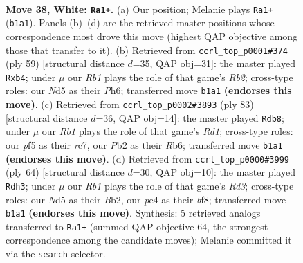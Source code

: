 \documentclass[11pt]{article}
\begin{document}
\clearpage

\begin{figure}[p]\centering
\begin{subfigure}{0.46\textwidth}\centering
\resizebox{\linewidth}{!}{%
\newchessgame
\chessboard[
  setfen={8/pp5R/8/2pN1p1P/k3p3/8/1P4rr/1R1K4 w - - 0 38},
  showmover=false,
  pgfstyle=straightmove, color=movearrow, markmove={b1-a1}
]}
\caption{}
\end{subfigure}\hfill
\begin{subfigure}{0.46\textwidth}\centering
\resizebox{\linewidth}{!}{%
\newchessgame
\chessboard[
  setfen={3r4/pr3k2/5P1p/4p3/1P5P/3p1P2/1P4P1/R2R2K1 b - - 0 30},
  showmover=false,
  pgfstyle=straightmove, color=movearrow, markmove={b7-b4}
]}
\caption{}
\end{subfigure}
\\[4pt]
\begin{subfigure}{0.46\textwidth}\centering
\resizebox{\linewidth}{!}{%
\newchessgame
\chessboard[
  setfen={3r3k/2R1R3/1r4p1/1p6/8/PP6/2P4P/2K2n2 b - - 5 42},
  showmover=false,
  pgfstyle=straightmove, color=movearrow, markmove={d8-b8}
]}
\caption{}
\end{subfigure}\hfill
\begin{subfigure}{0.46\textwidth}\centering
\resizebox{\linewidth}{!}{%
\newchessgame
\chessboard[
  setfen={5b2/3k1p2/1p6/3P4/2r3rP/1p1R4/1B6/1K5R w - - 0 33},
  showmover=false,
  pgfstyle=straightmove, color=movearrow, markmove={d3-h3}
]}
\caption{}
\end{subfigure}
\caption{\textbf{Move 38, White: \texttt{Ra1+}.} (a) Our position; Melanie plays \texttt{Ra1+} (\texttt{b1a1}). Panels (b)--(d) are the retrieved master positions whose correspondence most drove this move (highest QAP objective among those that transfer to it). (b) Retrieved from \texttt{ccrl\_top\_p0001\#374} (ply 59) [structural distance $d$=35, QAP obj=31]: the master played \texttt{Rxb4}; under $\mu$ our \emph{Rb1} plays the role of that game's \emph{Rb2}; cross-type roles: our \emph{N}d5 as their \emph{P}h6; transferred move \texttt{b1a1} \textbf{(endorses this move)}. (c) Retrieved from \texttt{ccrl\_top\_p0002\#3893} (ply 83) [structural distance $d$=36, QAP obj=14]: the master played \texttt{Rdb8}; under $\mu$ our \emph{Rb1} plays the role of that game's \emph{Rd1}; cross-type roles: our \emph{p}f5 as their \emph{r}c7, our \emph{P}b2 as their \emph{R}b6; transferred move \texttt{b1a1} \textbf{(endorses this move)}. (d) Retrieved from \texttt{ccrl\_top\_p0000\#3999} (ply 64) [structural distance $d$=30, QAP obj=10]: the master played \texttt{Rdh3}; under $\mu$ our \emph{Rb1} plays the role of that game's \emph{Rd3}; cross-type roles: our \emph{N}d5 as their \emph{B}b2, our \emph{p}e4 as their \emph{b}f8; transferred move \texttt{b1a1} \textbf{(endorses this move)}. Synthesis: 5 retrieved analogs transferred to \texttt{Ra1+} (summed QAP objective 64, the strongest correspondence among the candidate moves); Melanie committed it via the \texttt{search} selector.}
\label{fig:thought-m74}
\end{figure}
\end{document}
